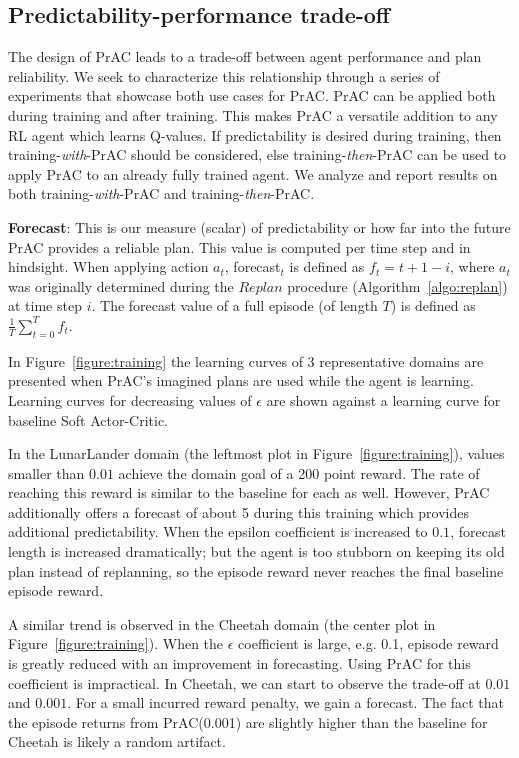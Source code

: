 \documentclass[letterpaper]{article} %
\begin{document}
\subsection{Predictability-performance trade-off}
The design of PrAC leads to a trade-off between agent performance and plan reliability. We seek to characterize this relationship through a series of experiments that showcase both use cases for PrAC. PrAC can be applied both during training and after training. This makes PrAC a versatile addition to any RL agent which learns Q-values. If predictability is desired during training, then training-\textit{with}-PrAC should be considered, else training-\textit{then}-PrAC can be used to apply PrAC to an already fully trained agent. We analyze and report results on both training-\textit{with}-PrAC and training-\textit{then}-PrAC.

\textbf{Forecast}: This is our measure (scalar) of predictability or how far into the future PrAC provides a reliable plan. This value is computed per time step and in hindsight. When applying action $a_t$, forecast$_t$ is defined as $f_t=t+1-i$, where $a_t$ was originally determined during the $Replan$ procedure (Algorithm~\ref{algo:replan}) at time step $i$. The forecast value of a full episode (of length $T$) is defined as $\frac{1}{T}\sum_{t=0}^Tf_t$.

In Figure~\ref{figure:training} the learning curves of 3 representative domains are presented when PrAC's imagined plans are used while the agent is learning. Learning curves for decreasing values of $\epsilon$ are shown against a learning curve for baseline Soft Actor-Critic.

In the LunarLander domain (the leftmost plot in Figure~\ref{figure:training}), values smaller than $0.01$ achieve the domain goal of a 200 point reward. The rate of reaching this reward is similar to the baseline for each as well. However, PrAC additionally offers a forecast of about 5 during this training which provides additional predictability. When the epsilon coefficient is increased to $0.1$, forecast length is increased dramatically; but the agent is too stubborn on keeping its old plan instead of replanning, so the episode reward never reaches the final baseline episode reward.

A similar trend is observed in the Cheetah domain (the center plot in Figure~\ref{figure:training}). When the $\epsilon$ coefficient is large, e.g. 0.1, episode reward is greatly reduced with an improvement in forecasting. Using PrAC for this coefficient is impractical. In Cheetah, we can start to observe the trade-off at $0.01$ and $0.001$. For a small incurred reward penalty, we gain a forecast. The fact that the episode returns from PrAC(0.001) are slightly higher than the baseline for Cheetah is likely a random artifact.
\end{document}

